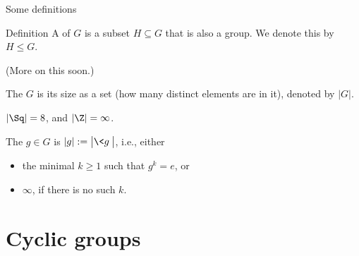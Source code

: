 \documentclass[8pt, handout]{beamer}
\newcommand{\Pause}{}
\begin{document}

\begin{frame}{Some definitions} %

  \begin{block}{Definition}
    A  of $G$ is a subset $H\subseteq G$ that
    is also a group. We denote this by $H\leq G$.
  \end{block}

  (More on this soon.)

  \bigskip\Pause
  
  \begin{definition}
    The  $G$ is its size as a set 
    (how many distinct elements are in it), denoted by
    $|G|$.
  \end{definition} \Pause

  \begin{example}
    $|\Sq| = 8$, and $|\Z| = \infty$.
  \end{example}

  \bigskip\Pause
  
  \begin{definition}
    The  $g\in G$ is
    $|g|:=\big|\<g\>\big|$, i.e., either \smallskip
    \begin{itemize}
    \item the minimal $k\geq 1$ such that $g^k=e$, or \smallskip
    \item $\infty$, if there is no such $k$.
    \end{itemize}
  \end{definition}
  
\end{frame}

\section{Cyclic groups}


\end{document}
